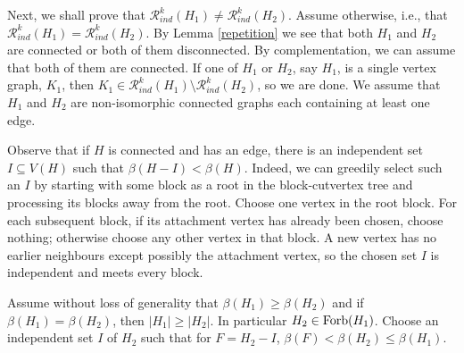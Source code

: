 \documentclass[11pt]{article}
\theoremstyle{plain}
\theoremstyle{definition}
\newcommand{\R}{\mathcal{R}}
\newcommand{\Forb}{{\rm Forb}}
\newcommand{\Rk}{\R_{ind}}
\begin{document}
 Next, we shall prove that $\R_{ind}^k(H_1) \neq \R_{ind}^k(H_2)$.  Assume otherwise, i.e., that $\R_{ind}^k(H_1) = \R_{ind}^k(H_2)$.
 By Lemma \ref{repetition} we see  that both $H_1$ and $H_2$ are connected or both of them disconnected. By complementation, we can  assume that 
both of them are connected. If one of $H_1$ or $H_2$, say $H_1$, is a single vertex graph, $K_1$,  then $K_1\in \Rk^k(H_1)\setminus \Rk^k(H_2)$, so we are done.  We assume that $H_1$ and $H_2$ are  non-isomorphic connected graphs each containing at least one edge. 

Observe that if $H$ is connected and has an edge, there is an independent set
$I\subseteq V(H)$ such that $\beta(H-I)<\beta(H)$.
Indeed, we can greedily select such an $I$ by starting with some block as a root  in the block-cutvertex tree and processing its blocks away from the root.
Choose one vertex in the root block. For each subsequent block, if its
attachment vertex has already been chosen, choose nothing; otherwise
choose any other vertex in that block. A new vertex has no earlier
neighbours except possibly the attachment vertex, so the chosen set $I$
is independent and meets every block. 


 Assume without loss of generality that $\beta(H_1)\geq \beta(H_2)$ and if $\beta(H_1)=\beta(H_2)$, then 
$|H_1|\geq |H_2|$. In particular  $H_2\in \Forb(H_1)$. Choose an independent set $I$ of $H_2$ such that for $F=H_2-I$, 
 $\beta(F)<\beta(H_2)\leq\beta(H_1)$. 
 
\end{document}
